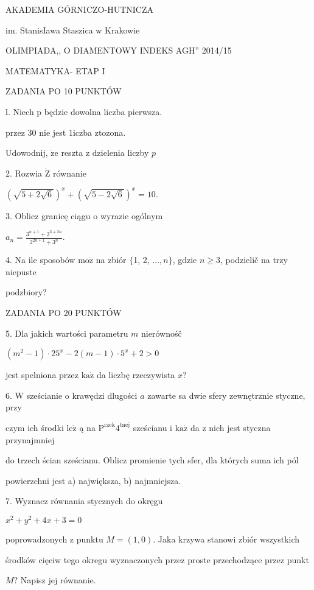 \documentclass[a4paper,12pt]{article}
\begin{document}
AKADEMIA GÓRNICZO-HUTNICZA

im. StanisIawa Staszica w Krakowie

OLIMPIADA,, O DIAMENTOWY INDEKS AGH'' 2014/15

MATEMATYKA- ETAP I

ZADANIA PO 10 PUNKTÓW

l. Niech p będzie dowolna liczba pierwsza.

przez 30 nie jest 1iczba ztozona.

Udowodnij, $\dot{\mathrm{z}}\mathrm{e}$ reszta z dzielenia liczby $p$

2. Rozwia $\dot{\mathrm{Z}}$ równanie

$(\sqrt{5+2\sqrt{6}})^{x}+(\sqrt{5-2\sqrt{6}})^{x}=10.$

3. Oblicz granicę ciągu o wyrazie ogólnym

$a_{n}=\displaystyle \frac{3^{n+1}+2^{3+2n}}{2^{2n+1}+3^{n}}.$

4. Na ile sposobów $\mathrm{m}\mathrm{o}\dot{\mathrm{z}}$ na zbiór $\{$1, 2, $\ldots, n\}$, gdzie $n\geq 3$, podzielič na trzy niepuste

podzbiory?

ZADANIA PO 20 PUNKTÓW

5. Dla jakich wartości parametru $m$ nierównośč

$(m^{2}-1)\cdot 25^{x}-2(m-1)\cdot 5^{x}+2>0$

jest spelniona przez $\mathrm{k}\mathrm{a}\dot{\mathrm{z}}$ da liczbę rzeczywista $x$?

6. $\mathrm{W}$ sześcianie o krawędzi dlugości $a$ zawarte sa dwie sfery zewnętrznie styczne, przy

czym ich środki $\mathrm{l}\mathrm{e}\dot{\mathrm{z}}$ ą na $\mathrm{P}^{\mathrm{r}\mathrm{z}\mathrm{e}\mathrm{k}}4^{\mathrm{t}\mathrm{n}\mathrm{e}\mathrm{j}}$ sześcianu i $\mathrm{k}\mathrm{a}\dot{\mathrm{z}}$ da z nich jest styczna przynajmniej

do trzech ścian sześcianu. Oblicz promienie tych sfer, dla których suma ich pól

powierzchni jest a) największa, b) najmniejsza.

7. Wyznacz równania stycznych do okręgu

$x^{2}+y^{2}+4x+3=0$

poprowadzonych z punktu $M = (1,0)$. Jaka krzywa stanowi zbiór wszystkich

środków cięciw tego okregu wyznaczonych przez proste przechodzące przez punkt

$M$? Napisz jej równanie.
\end{document}
